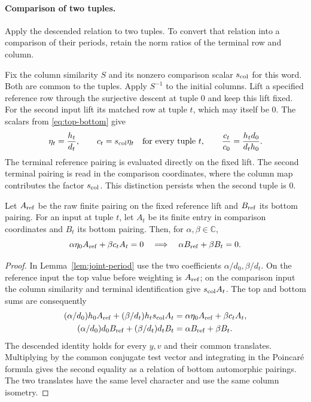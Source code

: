 \paragraph{Comparison of two tuples.}

Apply the descended relation to two tuples. To convert that relation into a comparison of their periods, retain the norm ratios of the terminal row and column.

Fix the column similarity \(S\) and its nonzero comparison scalar
\(s_{\rm col}\) for this word. Both are common to the tuples. Apply \(S^{-1}\)
to the initial columns. Lift a specified reference row through the
surjective descent at tuple \(0\) and keep this lift fixed. For the
second input lift its matched row at tuple \(t\), which may itself
be \(0\). The scalars from \eqref{eq:top-bottom} give
\[
   \eta_t=\frac{h_t}{d_t},\qquad c_t=s_{\rm col}\eta_t
   \quad\text{for every tuple }t,\qquad
   \frac{c_t}{c_0}=\frac{h_t d_0}{d_t h_0}.
\]
The terminal reference pairing is evaluated directly on the fixed
lift. The second terminal pairing is read in the comparison
coordinates, where the column map contributes the factor \(s_{\rm col}\).
This distinction persists when the second tuple is \(0\).

\begin{lemma}\label{lem:word-two-tuple-transfer}
Let \(A_{\rm ref}\) be the raw finite pairing on the fixed reference
lift and \(B_{\rm ref}\) its bottom pairing. For an input at tuple
\(t\), let \(A_t\) be its finite entry in comparison coordinates
and \(B_t\) its bottom pairing. Then, for \(\alpha,\beta\in\mathbb C\),
\[
 \alpha\eta_0 A_{\rm ref}+\beta c_t A_t=0
       \quad\Longrightarrow\quad \alpha B_{\rm ref}+\beta B_t=0 .
\]
\end{lemma}
\begin{proof}
In Lemma~\ref{lem:joint-period} use the two coefficients
\(\alpha/d_0,\beta/d_t\). On the reference input the top value
before weighting is \(A_{\rm ref}\); on the comparison input the
column similarity and terminal identification give \(s_{\rm col}A_t\).
The top and bottom sums are consequently
\[
 \begin{aligned}
  (\alpha/d_0)h_0 A_{\rm ref}+(\beta/d_t)h_t s_{\rm col} A_t
        &=\alpha\eta_0 A_{\rm ref}+\beta c_t A_t,\\
  (\alpha/d_0)d_0 B_{\rm ref}+(\beta/d_t)d_t B_t
        &=\alpha B_{\rm ref}+\beta B_t .
 \end{aligned}
\]
The descended identity holds for every \(y,v\) and their common
translates. Multiplying by the common conjugate test vector and
integrating in the Poincar\'e formula gives the second equality
as a relation of bottom automorphic pairings. The two translates
have the same level character and use the same column isometry.
\end{proof}


